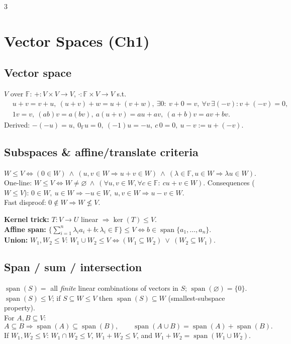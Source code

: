 \documentclass[9pt]{article}
\newcommand{\F}{\mathbb{F}}
\newcommand{\Ker}{\operatorname{ker}}
\newcommand{\spann}{\operatorname{span}}
\begin{document}
\begin{multicols}{3}
\scriptsize
\renewcommand{\baselinestretch}{0.8}
\raggedcolumns

\section*{Vector Spaces (Ch1)}

\subsection*{Vector space}
$V$ over $\F$: $+:V\times V\to V$, $\cdot:\F\times V\to V$ s.t.
\[
\begin{aligned}
&u+v=v+u,\ (u+v)+w=u+(v+w),\ \exists 0:\ v+0=v,\ \forall v\,\exists(-v):v+(-v)=0,\\
&1v=v,\ (ab)v=a(bv),\ a(u+v)=au+av,\ (a+b)v=av+bv.
\end{aligned}
\]
Derived: $-(-u)=u,\ 0_{\F}u=0,\ (-1)u=-u,\ c\,0=0,\ u-v:=u+(-v)$.

\subsection*{Subspaces \& affine/translate criteria}
$W\le V \iff (0\in W)\ \wedge\ (u,v\in W\Rightarrow u+v\in W)\ \wedge\ (\lambda\in\F,u\in W\Rightarrow \lambda u\in W)$.
One-line: $W\le V\iff W\neq\varnothing\ \wedge\ (\forall u,v\in W,\forall c\in\F:\ cu+v\in W)$.
Consequences ($W\le V$): $0\in W,\ u\in W\Rightarrow -u\in W,\ u,v\in W\Rightarrow u-v\in W$.\\
Fast disproof: $0\notin W\Rightarrow W\not\le V$.

\textbf{Kernel trick:} $T:V\to U$ linear $\Rightarrow \Ker(T)\le V$.\\
\textbf{Affine span:} $\{ \sum_{i=1}^n\lambda_i a_i+b:\lambda_i\in\F\}\le V\iff b\in\spann\{a_1,\dots,a_n\}$.\\
\textbf{Union:} $W_1,W_2\le V$: $W_1\cup W_2\le V\iff (W_1\subseteq W_2)\ \vee\ (W_2\subseteq W_1)$.

\subsection*{Span / sum / intersection}
$\spann(S)=$ all \emph{finite} linear combinations of vectors in $S$; $\spann(\varnothing)=\{0\}$.\\
$\spann(S)\le V$; if $S\subseteq W\le V$ then $\spann(S)\subseteq W$ (smallest-subspace property).\\
For $A,B\subseteq V$:
\[
A\subseteq B\Rightarrow \spann(A)\subseteq\spann(B),\qquad
\spann(A\cup B)=\spann(A)+\spann(B).
\]
If $W_1,W_2\le V$: $W_1\cap W_2\le V$, $W_1+W_2\le V$, and $W_1+W_2=\spann(W_1\cup W_2)$.


\end{multicols}
\end{document}
